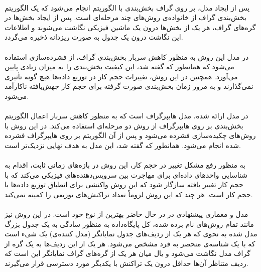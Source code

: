 \paragraph*{}
پس از ایجاد مدل، بر روی گراف بخش‌بندی با الگوریتم
\cite{metis-1996}
انجام می‌شود که یک الگوریتم بخش‌بندی گراف از خانواده‌ی روش‌های چند مرحله‌ای است. پس از ایجاد بخش‌ها در گره‌های گراف، هر یک از بخش‌ها درون یک ماشین فیزیکی نگاشت
می‌شوند و اطلاعات این نگاشت درون یک جدول به صورت ریزدانه
ذخیره می‌گردد.

\paragraph*{}
در مدل این روش به منظور کاهش سربار بخش‌بندی گراف، از فشرده‌سازی استفاده می‌شود که همانطور که گفته شد، این کیفیت بخش‌بندی را به میزان زیادی پایین می‌آورد. همچنین در این روش، تغییرات حجم کار در توزیع داده‌ها هیچ گونه تأثیری نمی‌گذارند و به مرور زمان بخش‌بندی صورت گرفته برای حجم کار جهش‌یافته
ناکارآمد می‌شود.
\cite{kamal-2016}

\paragraph*{}
در
\cite{sword-2013}
مدل ارائه شده، مدل هایپرگراف است که به منظور کاهش سربار اعمال الگوریتم بخش‌بندی بر روی هایپرگراف از روش دو مرحله‌ای استفاده می‌کند. در این روش با روش‌های چکیده‌سازی
فشرده می‌شود و پس از آن الگوریتم بر روی هایپرگراف فشرده شده انجام می‌شود. همانطور که گفته شد، این مدل به هدف نهایی نزدیک‌تر است.

\paragraph*{}
به منظور رفع مشکل تغییر در حجم کار، این روش در بازه‌های زمانی ثابت، اقدام به شناسایی واحدهای داده‌ای برای مهاجرت بین سرویس‌دهنده‌های فیزیکی می‌کند که با حجم کار تغییر یافته سازگار شود که این روش واکنشی برای انطباق توزیع داده‌ها با حجم کار است. هر چند که این روش لزوماً تعداد تراکنش‌های توزیعی را کمینه نمی‌کند.


\paragraph*{}
مدل و معماری پیشنهادی در
\cite{kamal-2016}
در حال حاضر بهترین از نوع خود
است. در این روش نیز مانند تمام روش‌های نام برده شده، کل پایگاه‌داده به منظور سادگی به یک جدول بزرگ مدل شده به نحوی که هر یک از ردیف‌های جدول نمایانگر (مدل کننده‌ی) یک شیء است که با یک شناسه‌ی منحصر به فرد
مشخص می‌شود. هر یک از این ردیف‌ها به یک گره از گراف مدل نگاشت می‌شود و یال میان هر یک از گره‌های گراف نمایانگر این است که ردیف متناظر آن‌ها حداقل درون یک تراکنش با یکدیگر مورد دسترسی قرار می‌گیرند.

